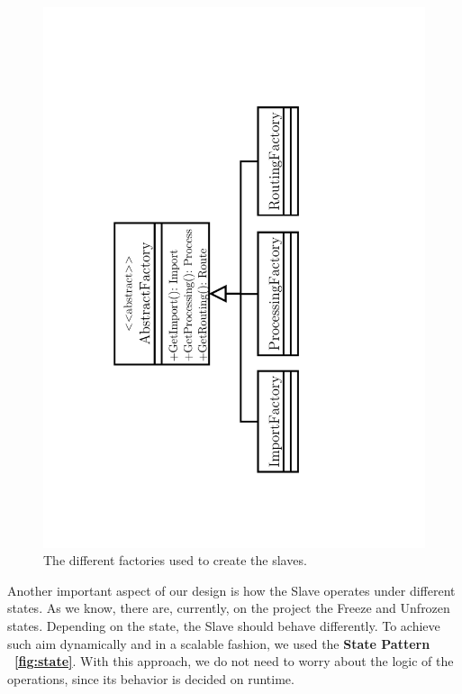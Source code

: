 \documentclass[times, 10pt,twocolumn]{article}
\begin{document}
\begin{figure}[h]
	\centering
	\includegraphics[angle=0, scale=0.35]{"Architecture/Factories"}
	\caption{The different factories used to create the slaves. } 
	\label{fig:factories}
\end{figure}

Another important aspect of our design is how the Slave operates under different states. As we know, there are, currently, on the project the Freeze and Unfrozen states. Depending on the state, the Slave should behave differently. To achieve such aim dynamically and in a scalable fashion, we used the \textbf{State Pattern} \textbf{~\cref{fig:state}}. With this approach, we do not need to worry about the logic of the operations, since its behavior is decided on runtime.
\end{document}
